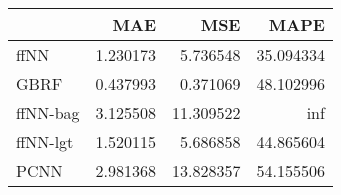 \begin{tabular}{lrrr}
\toprule
{} &       MAE &        MSE &       MAPE \\
\midrule
ffNN     &  1.230173 &   5.736548 &  35.094334 \\
GBRF     &  0.437993 &   0.371069 &  48.102996 \\
ffNN-bag &  3.125508 &  11.309522 &        inf \\
ffNN-lgt &  1.520115 &   5.686858 &  44.865604 \\
PCNN     &  2.981368 &  13.828357 &  54.155506 \\
\bottomrule
\end{tabular}
